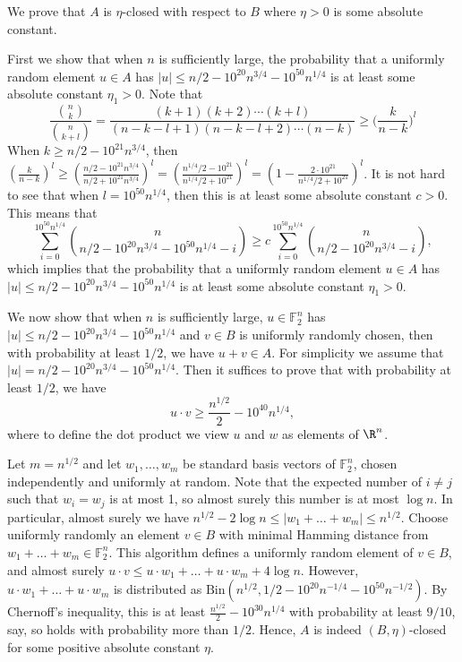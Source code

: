 \documentclass{toc}
\newcommand\F{\mathbb{F}}
\begin{document}
%
%
%
%
%
%
%
%
%

	We prove that $A$ is $\eta$-closed with respect to $B$ where $\eta>0$ is some absolute constant.

	First we show that when $n$ is sufficiently large, the probability that a uniformly random element $u\in A$ has $|u|\leq n/2-10^{20}n^{3/4}-10^{50}n^{1/4}$ is at least some absolute constant $\eta_1>0$. Note that
	\begin{equation*}
		\frac{\binom{n}{k}}{\binom{n}{k+l}}=\frac{(k+1)(k+2)\cdots(k+l)}{(n-k-l+1)(n-k-l+2)\cdots (n-k)}\geq \bigg(\frac{k}{n-k}\bigg)^l
	\end{equation*}
	When $k\geq n/2-10^{21}n^{3/4}$, then $(\frac{k}{n-k})^l\geq (\frac{n/2-10^{21}n^{3/4}}{n/2+10^{21}n^{3/4}})^l=(\frac{n^{1/4}/2-10^{21}}{n^{1/4}/2+10^{21}})^l=(1-\frac{2\cdot 10^{21}}{n^{1/4}/2+10^{21}})^l$. It is not hard to see that when $l=10^{50}n^{1/4}$, then this is at least some absolute constant $c>0$. This means that
	\begin{equation*}
		\sum_{i=0}^{10^{50}n^{1/4}} \binom{n}{n/2-10^{20}n^{3/4}-10^{50}n^{1/4}-i}\geq c \sum_{i=0}^{10^{50}n^{1/4}} \binom{n}{n/2-10^{20}n^{3/4}-i},
	\end{equation*}
	which implies that the probability that a uniformly random element $u\in A$ has $|u|\leq n/2-10^{20}n^{3/4}-10^{50}n^{1/4}$ is at least some absolute constant $\eta_1>0$.
	
	We now show that when $n$ is sufficiently large, $u\in \F_2^n$ has $|u|\leq n/2-10^{20}n^{3/4}-10^{50}n^{1/4}$ and $v\in B$ is uniformly randomly chosen, then with probability at least $1/2$, we have $u+v\in A$. For simplicity we assume that $|u|=n/2-10^{20}n^{3/4}-10^{50}n^{1/4}$. Then it suffices to prove that with probability at least $1/2$, we have
	\begin{equation}
		u\cdot v\geq \frac{n^{1/2}}{2}-10^{40}n^{1/4}, \label{eqn:udotv}
	\end{equation} where to define the dot product we view $u$ and $w$ as elements of $\R^n$.
	
	Let $m=n^{1/2}$ and let $w_1,\dots,w_m$ be standard basis vectors of $\F_2^n$, chosen independently and uniformly at random. Note that the expected number of $i\neq j$ such that $w_i=w_j$ is at most 1, so almost surely this number is at most $\log n$. In particular, almost surely we have $n^{1/2}-2\log n\leq |w_1+\dots+w_m|\leq n^{1/2}$. Choose uniformly randomly an element $v\in B$ with minimal Hamming distance from $w_1+\dots+w_m\in \F_2^n$. This algorithm defines a uniformly random element of $v\in B$, and almost surely $u\cdot v\leq u\cdot w_1+\dots+u\cdot w_m+4\log n$. However, $u\cdot w_1+\dots+u\cdot w_m$ is distributed as $\mathrm{Bin}(n^{1/2},1/2-10^{20}n^{-1/4}-10^{50}n^{-1/2})$. By Chernoff's inequality, this is at least $\frac{n^{1/2}}{2}-10^{30}n^{1/4}$ with probability at least $9/10$, say, so  holds with probability more than $1/2$. Hence, $A$ is indeed $(B,\eta)$-closed for some positive absolute constant $\eta$.
\end{document}
